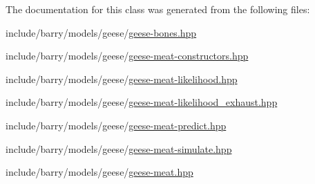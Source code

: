 The documentation for this class was generated from the following files\+:\begin{DoxyCompactItemize}
\item 
include/barry/models/geese/\hyperlink{geese-bones_8hpp}{geese-\/bones.\+hpp}\item 
include/barry/models/geese/\hyperlink{geese-meat-constructors_8hpp}{geese-\/meat-\/constructors.\+hpp}\item 
include/barry/models/geese/\hyperlink{geese-meat-likelihood_8hpp}{geese-\/meat-\/likelihood.\+hpp}\item 
include/barry/models/geese/\hyperlink{geese-meat-likelihood__exhaust_8hpp}{geese-\/meat-\/likelihood\+\_\+exhaust.\+hpp}\item 
include/barry/models/geese/\hyperlink{geese-meat-predict_8hpp}{geese-\/meat-\/predict.\+hpp}\item 
include/barry/models/geese/\hyperlink{geese-meat-simulate_8hpp}{geese-\/meat-\/simulate.\+hpp}\item 
include/barry/models/geese/\hyperlink{geese-meat_8hpp}{geese-\/meat.\+hpp}\end{DoxyCompactItemize}
